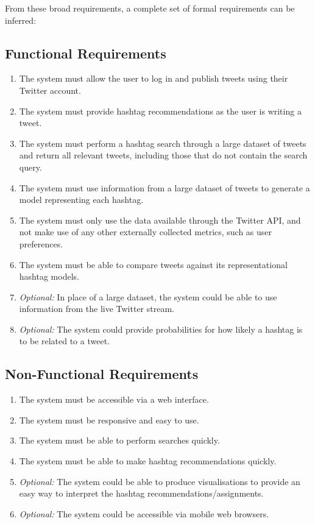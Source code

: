 \documentclass[11pt,a4paper]{report}
\begin{document}
From these broad requirements, a complete set of formal requirements can be inferred:

\subsection{Functional Requirements}
\label{ssec:funcreqs}
\begin{enumerate}
    \item \label{func:publish} The system must allow the user to log in and publish tweets using their Twitter account.
    \item \label{func:suggest} The system must provide hashtag recommendations as the user is writing a tweet.
    \item \label{func:search} The system must perform a hashtag search through a large dataset of tweets and return all relevant tweets, including those that do not contain the search query.
    \item \label{func:genmodel} The system must use information from a large dataset of tweets to generate a model representing each hashtag.
    \item \label{func:notpersonal} The system must only use the data available through the Twitter API, and not make use of any other externally collected metrics, such as user preferences.
    \item \label{func:compmodels} The system must be able to compare tweets against its representational hashtag models.
    \item \label{func:stream} \emph{Optional:} In place of a large dataset, the system could be able to use information from the live Twitter stream.
    \item \label{func:probabilities} \emph{Optional:} The system could provide probabilities for how likely a hashtag is to be related to a tweet.
\end{enumerate}

\subsection{Non-Functional Requirements}
\label{ssec:nfuncreqs}
\begin{enumerate}
    \item \label{nfunc:web} The system must be accessible via a web interface.
    \item \label{nfunc:easy} The system must be responsive and easy to use.
    \item \label{nfunc:qsearch} The system must be able to perform searches quickly.
    \item \label{nfunc:qsuggest} The system must be able to make hashtag recommendations quickly.
    \item \label{nfunc:graphs} \emph{Optional:} The system could be able to produce visualisations to provide an easy way to interpret the hashtag recommendations/assignments.
    \item \label{nfunc:mobile} \emph{Optional:} The system could be accessible via mobile web browsers.
\end{enumerate}
\end{document}
